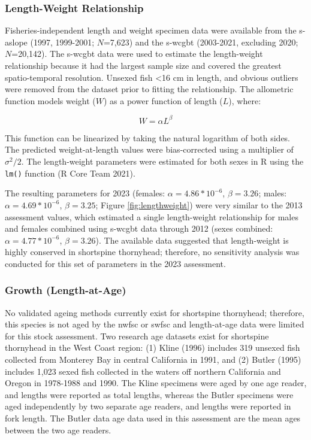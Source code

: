 \documentclass[11pt,
  letterpaper,
]{article}
\begin{document}
\hypertarget{length-weight-relationship}{%
\subsubsection{Length-Weight Relationship}\label{length-weight-relationship}}

Fisheries-independent length and weight specimen data were available from the \gls{s-aslope} (1997, 1999-2001; \(N\)=7,623) and the \gls{s-wcgbt} (2003-2021, excluding 2020; \(N\)=20,142). The \gls{s-wcgbt} data were used to estimate the length-weight relationship because it had the largest sample size and covered the greatest spatio-temporal resolution. Unsexed fish \textless16 cm in length, and obvious outliers were removed from the dataset prior to fitting the relationship. The allometric function models weight (\(W\)) as a power function of length (\(L\)), where:

\begin{equation} W = \alpha L^{\beta} \end{equation}

This function can be linearized by taking the natural logarithm of both sides. The predicted weight-at-length values were bias-corrected using a multiplier of \(\sigma^2 / 2\). The length-weight parameters were estimated for both sexes in R using the \texttt{lm()} function (R Core Team 2021).

The resulting parameters for 2023 (females: \(\alpha = 4.86*10^{-6}\), \(\beta = 3.26\); males: \(\alpha = 4.69*10^{-6}\), \(\beta = 3.25\); Figure \ref{fig:lengthweight}) were very similar to the 2013 assessment values, which estimated a single length-weight relationship for males and females combined using \gls{s-wcgbt} data through 2012 (sexes combined: \(\alpha = 4.77*10^{-6}\), \(\beta=3.26\)). The available data suggested that length-weight is highly conserved in shortspine thornyhead; therefore, no sensitivity analysis was conducted for this set of parameters in the 2023 assessment.

\hypertarget{growth-length-at-age}{%
\subsubsection{Growth (Length-at-Age)}\label{growth-length-at-age}}

No validated ageing methods currently exist for shortspine thornyhead; therefore, this species is not aged by the \gls{nwfsc} or \gls{swfsc} and length-at-age data were limited for this stock assessment. Two research age datasets exist for shortspine thornyhead in the West Coast region: (1) Kline (1996) includes 319 unsexed fish collected from Monterey Bay in central California in 1991, and (2) Butler (1995) includes 1,023 sexed fish collected in the waters off northern California and Oregon in 1978-1988 and 1990. The Kline specimens were aged by one age reader, and lengths were reported as total lengths, whereas the Butler specimens were aged independently by two separate age readers, and lengths were reported in fork length. The Butler data age data used in this assessment are the mean ages between the two age readers.
\end{document}
